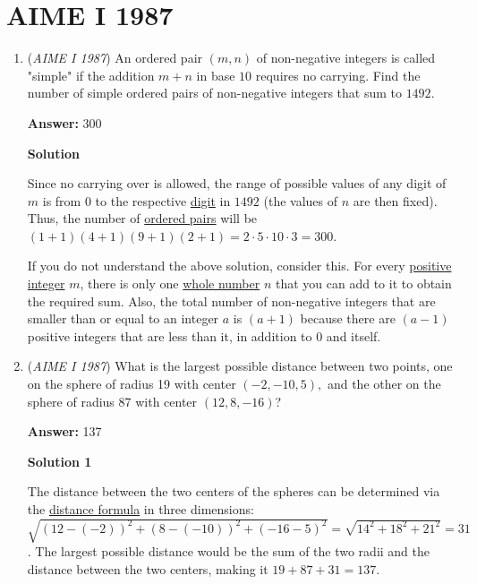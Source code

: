 \section{AIME I 1987}
        \begin{enumerate}
        	\item (\textit{AIME I 1987}) An ordered pair $(m,n)$ of non-negative integers is called "simple" if the addition $m+n$ in base $10$ requires no carrying. Find the number of simple ordered pairs of non-negative integers that sum to $1492$. 


 
 \textbf{Answer: }300



\textbf{Solution}

Since no carrying over is allowed, the range of possible values of any digit of $m$ is from $0$ to the respective \href{https://artofproblemsolving.com/wiki/index.php?title=Digit}{digit} in $1492$ (the values of $n$ are then fixed). Thus, the number of \href{https://artofproblemsolving.com/wiki/index.php?title=Ordered\_pair}{ordered pairs} will be $(1 + 1)(4 + 1)(9 + 1)(2 + 1) = 2\cdot 5\cdot 10\cdot 3 = \boxed{300}$.

 


 
If you do not understand the above solution, consider this. For every \href{https://artofproblemsolving.com/wiki/index.php?title=Positive\_integer}{positive integer} $m$, there is only one \href{https://artofproblemsolving.com/wiki/index.php?title=Whole\_number}{whole number} $n$ that you can add to it to obtain the required sum. Also, the total number of non-negative integers that are smaller than or equal to an integer $a$ is $(a + 1)$ because there are $(a - 1)$ positive integers that are less than it, in addition to $0$ and itself.

 


	\item (\textit{AIME I 1987}) What is the largest possible distance between two points, one on the sphere of radius 19 with center $(-2,-10,5),$ and the other on the sphere of radius 87 with center $(12,8,-16)$?


 
 \textbf{Answer: }137



\textbf{Solution 1}

The distance between the two centers of the spheres can be determined via the \href{https://artofproblemsolving.com/wiki/index.php?title=Distance\_formula}{distance formula} in three dimensions: $\sqrt{(12 - (-2))^2 + (8 - (-10))^2 + (-16 - 5)^2} = \sqrt{14^2 + 18^2 + 21^2} = 31$. The largest possible distance would be the sum of the two radii and the distance between the two centers, making it $19 + 87 + 31 = \boxed{137}$.


\end{enumerate}
